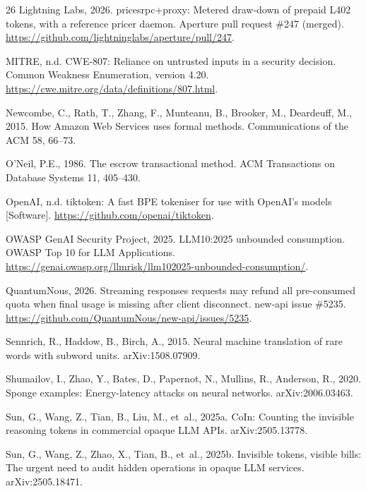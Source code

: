 \documentclass[preprint,3p,authoryear,12pt]{elsarticle}
\begin{document}
\begin{thebibliography}{26}
Lightning Labs, 2026. pricesrpc+proxy: Metered draw-down of prepaid L402 tokens, with a
reference pricer daemon. Aperture pull request \#247 (merged).
\url{https://github.com/lightninglabs/aperture/pull/247}.

MITRE, n.d. CWE-807: Reliance on untrusted inputs in a security decision. Common
Weakness Enumeration, version 4.20. \url{https://cwe.mitre.org/data/definitions/807.html}.

Newcombe, C., Rath, T., Zhang, F., Munteanu, B., Brooker, M., Deardeuff, M., 2015. How
Amazon Web Services uses formal methods. Communications of the ACM 58, 66--73.

O'Neil, P.E., 1986. The escrow transactional method. ACM Transactions on Database
Systems 11, 405--430.

OpenAI, n.d. tiktoken: A fast BPE tokeniser for use with OpenAI's models [Software].
\url{https://github.com/openai/tiktoken}.

OWASP GenAI Security Project, 2025. LLM10:2025 unbounded consumption. OWASP Top 10 for
LLM Applications.
\url{https://genai.owasp.org/llmrisk/llm102025-unbounded-consumption/}.

QuantumNous, 2026. Streaming responses requests may refund all pre-consumed quota when
final usage is missing after client disconnect. new-api issue \#5235.
\url{https://github.com/QuantumNous/new-api/issues/5235}.

Sennrich, R., Haddow, B., Birch, A., 2015. Neural machine translation of rare words
with subword units. arXiv:1508.07909.

Shumailov, I., Zhao, Y., Bates, D., Papernot, N., Mullins, R., Anderson, R., 2020.
Sponge examples: Energy-latency attacks on neural networks. arXiv:2006.03463.

Sun, G., Wang, Z., Tian, B., Liu, M., et~al., 2025a. CoIn: Counting the invisible
reasoning tokens in commercial opaque LLM APIs. arXiv:2505.13778.

Sun, G., Wang, Z., Zhao, X., Tian, B., et~al., 2025b. Invisible tokens, visible bills:
The urgent need to audit hidden operations in opaque LLM services. arXiv:2505.18471.


\end{thebibliography}
\end{document}
